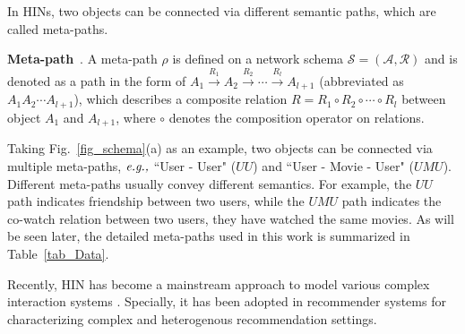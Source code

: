 In HINs, two objects can be connected via different semantic paths, which are called meta-paths.

\begin{myDef}
\textbf{Meta-path}~\cite{sun2011pathsim}. A meta-path $\rho$ is defined on a network schema $\mathcal{S} = (\mathcal{A}, \mathcal{R})$  and is denoted as a path in the form of $A_1 \xrightarrow{R_1} A_2 \xrightarrow{R_2} \cdots \xrightarrow{R_l} A_{l+1}$ (abbreviated as $A_1A_2 \cdots A_{l+1}$), which describes a composite relation $R = R_1 \circ R_2 \circ \cdots \circ R_l$ between object $A_1$ and $A_{l+1}$, where $\circ$ denotes the composition operator on relations.
\end{myDef}

\begin{exmp}
Taking Fig.~\ref{fig_schema}(a) as an example, two objects can be connected via multiple meta-paths, $\emph{e.g.,}$ ``User - User" ($UU$) and  ``User - Movie - User" ($UMU$). Different meta-paths usually convey different semantics. For example, the $UU$ path indicates friendship between two users, while the $UMU$ path indicates the co-watch relation between two users, \ie they have watched the same movies. As will be seen later, the detailed meta-paths used in this work is summarized in Table~\ref{tab_Data}.
\end{exmp}


Recently, HIN has become a mainstream approach to model various complex interaction systems \cite{shi2017survey}. Specially, it has been adopted in recommender systems for characterizing complex and heterogenous recommendation settings.



